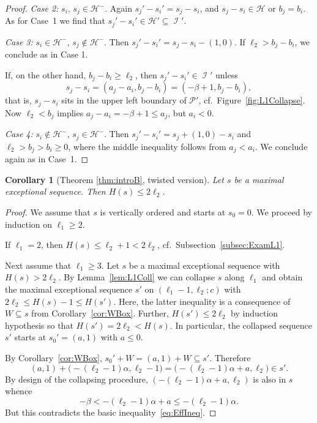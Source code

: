 \documentclass[11pt]{article}
\newtheorem{coro}[theo]{Corollary}
\theoremstyle{definition}
\numberwithin{equation}{section}
\newcommand{\CH}{{\mathcal H}}
\newcommand{\CI}{{\mathcal I}}
\newcommand{\CP}{{\mathcal P}}
\newcommand{\nImm}{\operatorname{\CI}}
\newcommand{\xa}{\alpha}
\newcommand{\xb}{\beta}
\newcommand{\cl}{s}
\newcommand{\mes}{maximal exceptional sequence}
\newcommand{\ssect}[1]{Subsection~\ref{#1}}
\newcommand{\thHeight}{\ref{thm:introB}}
\begin{document}
\begin{proof}
{\em Case 2:} $\cl_i,\,\cl_j\in\CH^-$. Again $\cl_j'-\cl_i'=
\cl_j-\cl_i$, and $\cl_j-\cl_i\in\CH$ or 
$b_j=b_i$. As for Case~1 we find that $\cl_j'-\cl_i'\in\CH'
\subseteq\nImm'$.

{\em Case 3:} $\cl_i\in\CH^-$, $\cl_j\not\in\CH^-$. Then 
$\cl_j'-\cl_i'=\cl_j-\cl_i-(1,0)$. If $\ell_2>b_j-b_i$, we 
conclude as in Case 1. 

If, on the other hand, $b_j-b_i\geq\ell_2$, then $\cl_j'-\cl_i'
\in\nImm'$ unless
$$
\cl_j-\cl_i=(a_j-a_i,b_j-b_i)=(-\xb+1,b_j-b_i),
$$ 
that is, $\cl_j-\cl_i$ sits in the upper left boundary of $\CP'$,
cf.~Figure~\ref{fig:L1Collapse}. Now $\ell_2<b_j$ implies
$a_j-a_i=-\xb+1\leq a_j$, but $a_i<0$.

{\em Case 4:} $\cl_i\not\in\CH^-$, $\cl_j\in\CH^-$. Then 
$\cl_j'-\cl_i'=\cl_j+(1,0)-\cl_i$ and $\ell_2>b_j>b_i\geq0$,
where the middle inequality follows from $a_j<a_i$. 
We conclude again as in Case~1. 
\end{proof}

\begin{coro}[Theorem {\thHeight}, twisted version]
\label{cor:HeightConstraint}
Let $\cl$ be a {\mes}. Then $H(\cl)\leq2\ell_2$. 
\end{coro}

\begin{proof}
We assume that $\cl$ is vertically ordered and starts at 
$\cl_0=0$. We proceed by induction on $\ell_1\geq2$.

If $\ell_1=2$, then $H(\cl)\leq\ell_2+1<2\ell_2$, 
cf.\ \ssect{subsec:ExamL1}.

Next assume that $\ell_1\geq3$. Let $\cl$ be a {\mes} with 
$H(\cl)>2\ell_2$. By Lemma~\ref{lem:L1Coll} we can 
collapse $\cl$ along $\ell_1$ and obtain the {\mes} $\cl'$ 
on $(\ell_1-1,\ell_2;c)$ with $2\ell_2\leq H(\cl)-1\leq H(\cl')$.
Here, the latter inequality is a consequence of 
$W\subseteq\cl$ from Corollary~\ref{cor:WBox}. 
Further, $H(\cl')\leq2\ell_2$ by induction hypothesis so that 
$H(\cl')=2\ell_2<H(\cl)$. In particular, the collapsed 
sequence $\cl'$ starts at $\cl_0'=(a,1)$ with $a\leq0$.

By Corollary~\ref{cor:WBox}, $\cl_0'+W=(a,1)+W\subseteq\cl'$. 
Therefore
$$
(a,1)+\big(-(\ell_2-1)\xa,\ell_2-1\big)=\big(-(\ell_2-1)\xa+a,\ell_2\big)\in\cl'.
$$
By design of the collapsing procedure, $(-(\ell_2-1)\xa+a,\ell_2)$ 
is also in $\cl$ whence 
$$
-\xb<-(\ell_2-1)\xa+a\leq-(\ell_2-1)\xa.
$$
But this contradicts the basic inequality~\eqref{eq:EffIneq}.
\end{proof}
\end{document}
